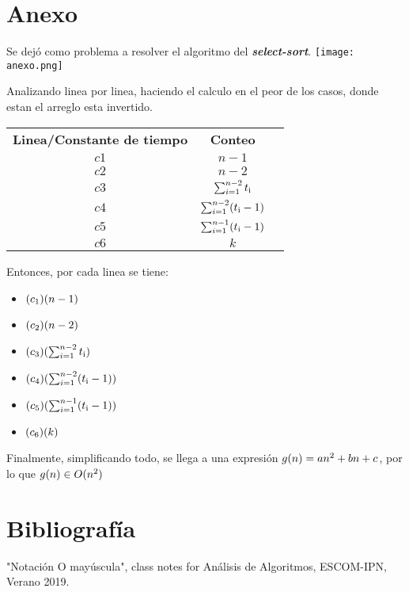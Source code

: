 \documentclass[12pt,twoside]{article}
\begin{document}
\section{Anexo}
\begin{center}
Se dej\'o como problema a resolver el algoritmo del  \textit{\textbf{select-sort}}.
\texttt{[image: anexo.png]}
\end{center}
Analizando linea por linea, haciendo el calculo en el peor de los casos, donde estan el arreglo esta invertido.
\begin{center}
\begin{tabular}{ |c|c|c| } 
 \hline
 \textbf{Linea/Constante de tiempo} & \textbf{Conteo} \\ 
 $c1$ & $n-1$ \\ 
 $c2$ & $n-2$ \\  
 $c3$ & $\sum_{i=1}^{n-2} t\textsubscript{i}$ \\
 $c4$ & $\sum_{i=1}^{n-2} (t\textsubscript{i} - 1)$ \\
 $c5$ & $\sum_{i=1}^{n-1} (t\textsubscript{i} - 1)$ \\ 
 $c6$ & $k$ \\ 
 \hline
\end{tabular}
\end{center}
Entonces, por cada linea se tiene:
\newline
\begin{itemize}
    \item $(c\textsubscript{1})(n-1)$
    \item $(c\textsubscript{2})(n-2)$
    \item $(c\textsubscript{3})(\sum_{i=1}^{n-2} t\textsubscript{i})$
    \item $(c\textsubscript{4})(\sum_{i=1}^{n-2} (t\textsubscript{i} - 1))$
    \item $(c\textsubscript{5})(\sum_{i=1}^{n-1} (t\textsubscript{i} - 1))$
    \item $(c\textsubscript{6})(k)$
\end{itemize}
Finalmente, simplificando todo, se llega a una expresión $g(n)=an\textsuperscript{2}+bn+c$, por lo que $g(n)\in O(n\textsuperscript{2})$
\section{Bibliograf\'ia}
"Notación O mayúscula", class notes for Análisis de Algoritmos, ESCOM-IPN, Verano 2019.
\end{document}
